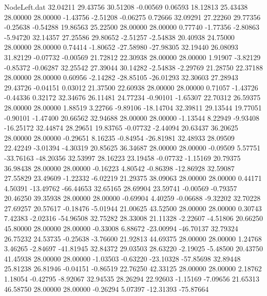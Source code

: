 \begin{filecontents}{NodeLeft.dat}
  32.04211   29.43756   30.51208    -0.00569    0.06593   18.12813   25.43438   28.00000   28.00000   -1.43756   -2.51208   -0.06275    0.72666
  32.09291   27.22260   29.77356    -0.25638   -0.54288   19.86563   25.22500   28.00000   28.00000    0.77740   -1.77356   -2.80863   -5.94720
  32.14357   27.25586   29.80652    -2.51257   -2.54838   20.40938   24.75000   28.00000   28.00000    0.74414   -1.80652  -27.58980  -27.98305
  32.19440   26.08093   31.82129    -0.07732   -0.00569   21.72812   22.30938   28.00000   28.00000    1.91907   -3.82129   -0.85372   -0.06287
  32.25542   27.39044   30.14282    -2.54838   -2.29769   21.28750   22.37188   28.00000   28.00000    0.60956   -2.14282  -28.85105  -26.01293
  32.30603   27.28943   29.43726    -0.04151    0.03012   21.37500   22.60938   28.00000   28.00000    0.71057   -1.43726   -0.44336    0.32172
  32.34676   26.11481   24.77234    -0.90101   -1.65307   22.70312   26.59375   28.00000   28.00000    1.88519    3.22766   -9.89106  -18.14704
  32.39811   29.13544   19.77051    -0.90101   -1.47400   20.66562   32.94688   28.00000   28.00000   -1.13544    8.22949   -9.93408  -16.25172
  32.44874   28.29651   19.83765    -0.07732   -2.44094   20.63437   36.20625   28.00000   28.00000   -0.29651    8.16235   -0.84954  -26.81981
  32.48933   28.09509   22.42249    -3.01394   -4.30319   20.85625   36.34687   28.00000   28.00000   -0.09509    5.57751  -33.76163  -48.20356
  32.53997   28.16223   23.19458    -0.07732   -1.15169   20.79375   36.98438   28.00000   28.00000   -0.16223    4.80542   -0.86398  -12.86928
  32.59087   27.55829   23.49609    -1.22332   -6.02219   21.29375   38.09063   28.00000   28.00000    0.44171    4.50391  -13.49762  -66.44653
  32.65165   28.69904   23.59741    -0.00569   -0.79357   20.46250   39.35938   28.00000   28.00000   -0.69904    4.40259   -0.06688   -9.32202
  32.70228   27.69257   20.57617    -0.18476   -5.01944   21.00625   43.52500   28.00000   28.00000    0.30743    7.42383   -2.02316  -54.96508
  32.75282   28.33008   21.11328    -2.22607   -4.51806   20.66250   45.80000   28.00000   28.00000   -0.33008    6.88672  -23.00994  -46.70137
  32.79324   26.75232   24.53735    -0.25638   -3.76600   21.92813   44.69375   28.00000   28.00000    1.24768    3.46265   -2.84697  -41.81945
  32.84372   29.03503   28.63220    -2.19025   -5.48500   20.43750   41.45938   28.00000   28.00000   -1.03503   -0.63220  -23.10328  -57.85698
  32.89448   25.81238   26.81946    -0.04151   -0.86519   22.76250   42.33125   28.00000   28.00000    2.18762    1.18054   -0.42795   -8.92067
  32.94535   28.26294   22.92603    -1.15169   -7.09656   21.65313   46.58750   28.00000   28.00000   -0.26294    5.07397  -12.31393  -75.87664

\end{filecontents}
